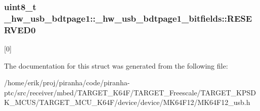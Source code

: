 \subsubsection[{\texorpdfstring{R\+E\+S\+E\+R\+V\+E\+D0}{RESERVED0}}]{\setlength{\rightskip}{0pt plus 5cm}uint8\+\_\+t \+\_\+hw\+\_\+usb\+\_\+bdtpage1\+::\+\_\+hw\+\_\+usb\+\_\+bdtpage1\+\_\+bitfields\+::\+R\+E\+S\+E\+R\+V\+E\+D0}\hypertarget{struct__hw__usb__bdtpage1_1_1__hw__usb__bdtpage1__bitfields_a49fc5458006914ea8ea8b1e910de5530}{}\label{struct__hw__usb__bdtpage1_1_1__hw__usb__bdtpage1__bitfields_a49fc5458006914ea8ea8b1e910de5530}
\mbox{[}0\mbox{]} 

The documentation for this struct was generated from the following file\+:\begin{DoxyCompactItemize}
\item 
/home/erik/proj/piranha/code/piranha-\/ptc/src/receiver/mbed/\+T\+A\+R\+G\+E\+T\+\_\+\+K64\+F/\+T\+A\+R\+G\+E\+T\+\_\+\+Freescale/\+T\+A\+R\+G\+E\+T\+\_\+\+K\+P\+S\+D\+K\+\_\+\+M\+C\+U\+S/\+T\+A\+R\+G\+E\+T\+\_\+\+M\+C\+U\+\_\+\+K64\+F/device/device/\+M\+K64\+F12/M\+K64\+F12\+\_\+usb.\+h\end{DoxyCompactItemize}
